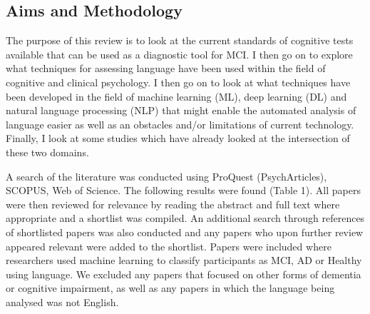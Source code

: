 \documentclass[10pt, letterpaper, twoside, openany]{book}
\begin{document}
\subsection{Aims and Methodology}
\par
The purpose of this review is to look at the current standards of cognitive tests available that can be used as a diagnostic tool for MCI. I then go on to explore what techniques for assessing language have been used within the field of cognitive and clinical psychology. I then go on to look at what techniques have been developed in the field of machine learning (ML), deep learning (DL) and natural language processing (NLP) that might enable the automated analysis of language easier as well as an obstacles and/or limitations of current technology. Finally, I look at some studies which have already looked at the intersection of these two domains. \newline
\par
A search of the literature was conducted using ProQuest (PsychArticles), SCOPUS, Web of Science. The following results were found (Table 1). All papers were then reviewed for relevance by reading the abstract and full text where appropriate and a shortlist was compiled. An additional search through references of shortlisted papers was also conducted and any papers who upon further review appeared relevant were added to the shortlist. Papers were included where researchers used machine learning to classify participants as MCI, AD or Healthy using language. We excluded any papers that focused on other forms of dementia or cognitive impairment, as well as any papers in which the language being analysed was not English. 
\end{document}
